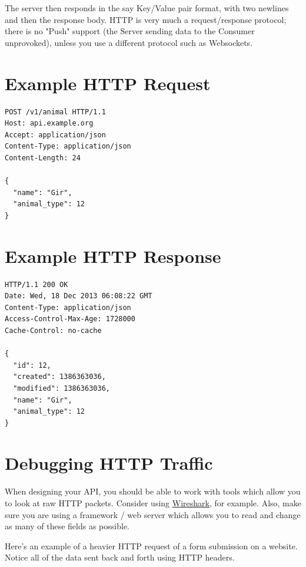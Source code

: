 \documentclass{book}
\begin{document}
The server then responds in the say Key/Value pair format, with two newlines and then the response body. HTTP is very much a request/response protocol; there is no "Push" support (the Server sending data to the Consumer unprovoked), unless you use a different protocol such as Websockets.

\section{Example HTTP Request}

\begin{verbatim}
POST /v1/animal HTTP/1.1
Host: api.example.org
Accept: application/json
Content-Type: application/json
Content-Length: 24

{
  "name": "Gir",
  "animal_type": 12
}
\end{verbatim}

\section{Example HTTP Response}

\begin{verbatim}
HTTP/1.1 200 OK
Date: Wed, 18 Dec 2013 06:08:22 GMT
Content-Type: application/json
Access-Control-Max-Age: 1728000
Cache-Control: no-cache

{
  "id": 12,
  "created": 1386363036,
  "modified": 1386363036,
  "name": "Gir",
  "animal_type": 12
}
\end{verbatim}

\section{Debugging HTTP Traffic}

When designing your API, you should be able to work with tools which allow you to look at raw HTTP packets. Consider using \href{https://www.wireshark.org}{Wireshark}, for example. Also, make sure you are using a framework / web server which allows you to read and change as many of these fields as possible.

Here's an example of a heavier HTTP request of a form submission on a website. Notice all of the data sent back and forth using HTTP headers.
\end{document}
